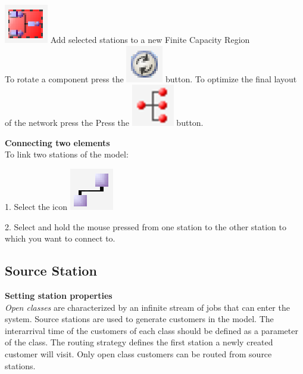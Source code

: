 \includegraphics[scale=.5]{img/jsimg/addStationToNFCR}  Add selected stations to a new Finite Capacity
Region\\
To rotate a component press the
\includegraphics[scale=.5]{img/jsimg/rotate} button.
To optimize the final layout of the network press the Press the
\includegraphics[scale=.5]{img/jsimg/optimizeGraph} button.

\textbf{Connecting two elements}\\
To link two stations of the model:

1. Select the icon
\includegraphics[scale=.5]{img/jsimg/connect}

2. Select and hold the mouse pressed from one station to the other
station to which you want to connect to.


\subsection{Source Station}
\label{sstatlab} \textbf{Setting station properties}\\ \emph{Open
classes} are characterized by an infinite stream of jobs that can
enter the system. Source stations are used to generate customers
in the model. The interarrival time of the customers of each class
should be defined as a parameter of the class. The routing
strategy defines the first station a newly created customer will
visit. Only open class customers can be routed from source
stations.\\

